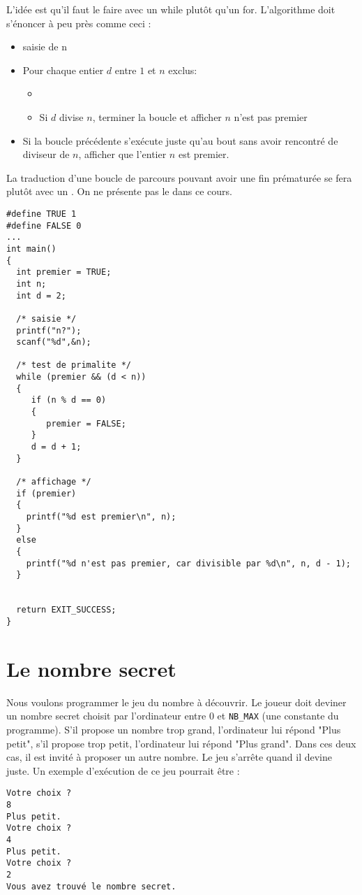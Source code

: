 \begin{correction}
L'idée est qu'il faut le faire avec un while plutôt qu'un
for. L'algorithme doit s'énoncer à peu près comme ceci :
\begin{itemize}
\item saisie de n 
\item Pour chaque entier $d$ entre $1$ et $n$ exclus:
  \begin{itemize}
  \item \item Si $d$ divise $n$, terminer la boucle et afficher $n$
    n'est pas premier
  \end{itemize}
\item Si la boucle précédente s'exécute juste qu'au bout sans avoir
  rencontré de diviseur de $n$, afficher que l'entier $n$ est premier.
\end{itemize}
La traduction d'une boucle de parcours pouvant avoir une fin prématurée se fera
plutôt avec un . On ne présente pas le  dans ce cours.
\begin{verbatim}
#define TRUE 1
#define FALSE 0
...
int main()
{
  int premier = TRUE;
  int n;
  int d = 2;
 
  /* saisie */
  printf("n?");
  scanf("%d",&n);

  /* test de primalite */
  while (premier && (d < n))
  {
     if (n % d == 0)
     {
        premier = FALSE;
     }
     d = d + 1;
  }

  /* affichage */
  if (premier)
  {
    printf("%d est premier\n", n);
  }
  else
  {
    printf("%d n'est pas premier, car divisible par %d\n", n, d - 1);
  }


  return EXIT_SUCCESS;
}
\end{verbatim}
\end{correction}


\section{Le nombre secret}

Nous voulons programmer le jeu du nombre à découvrir. Le joueur doit
deviner un nombre secret choisit par l'ordinateur entre 0 et \verb|NB_MAX| (une constante du programme). S'il propose un nombre trop
grand, l'ordinateur lui répond "Plus petit", s'il propose trop petit, l'ordinateur lui répond "Plus grand". Dans ces deux cas, il
est invité à proposer un autre nombre. Le jeu s'arrête quand il devine juste.
Un exemple d'exécution de ce jeu pourrait être :
\begin{verbatim}
Votre choix ?
8
Plus petit.
Votre choix ?
4
Plus petit.
Votre choix ?
2
Vous avez trouvé le nombre secret.
\end{verbatim}

